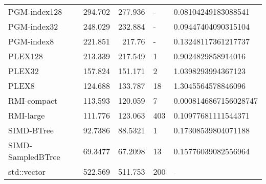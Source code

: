 \begin{tabular}{lrrll}
 PGM-index128      &               294.702  &              277.936  & -            & 0.08104249183088541   \\
 PGM-index32       &               248.029  &              232.884  & -            & 0.09447404090315104   \\
 PGM-index8        &               221.851  &              217.76   & -            & 0.13248117361217737   \\
 PLEX128           &               213.339  &              217.549  & 1            & 0.9024829858914016    \\
 PLEX32            &               157.824  &              151.171  & 2            & 1.0398293994367123    \\
 PLEX8             &               124.688  &              133.787  & 18           & 1.3045564578846096    \\
 RMI-compact       &               113.593  &              120.059  & 7            & 0.0008146867156028747 \\
 RMI-large         &               111.776  &              123.063  & 403          & 0.10977681111544371   \\
 SIMD-BTree        &                92.7386 &               88.5321 & 1            & 0.17308539804071188   \\
 SIMD-SampledBTree &                69.3477 &               67.2098 & 13           & 0.15776039082556964   \\
 std::vector       &               522.569  &              511.753  & 200          & -                     \\
\hline
\end{tabular}
